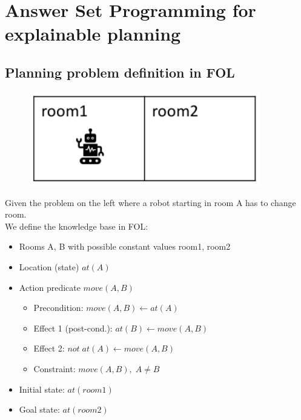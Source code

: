 \section{Answer Set Programming for explainable planning}
\subsection{Planning problem definition in FOL}
\begin{minipage}[t]{0.2\textwidth}
    \begin{figure}[H]
        \includegraphics[width=0.9\textwidth]{img/env.png}
        \centering
    \end{figure}
\end{minipage}
\begin{minipage}[t]{0.8\textwidth}
    Given the problem on the left where a robot starting in room A has to change room.\\
    We define the knowledge base in FOL:
    \begin{itemize}
        \item Rooms A, B with possible constant values room1, room2
        \item Location (state) $at(A)$
        \item Action predicate $move(A, B)$
        \begin{itemize}
            \item Precondition: $move(A, B) \leftarrow at(A)$
            \item Effect 1 (post-cond.): $at(B) \leftarrow move(A, B)$
            \item Effect 2: $not\;at(A) \leftarrow move(A, B)$
            \item Constraint: $move(A, B),\;A \ne B$
        \end{itemize}
        \item Initial state: $at(room1)$
        \item Goal state: $at(room2)$
    \end{itemize}
\end{minipage}

